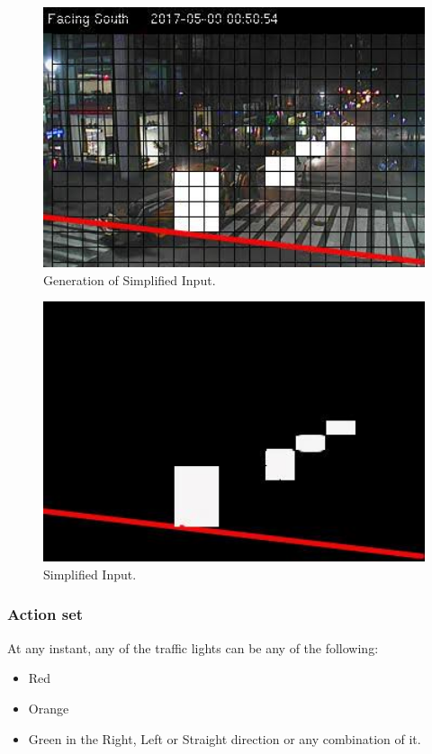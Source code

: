 \documentclass[a4paper,11pt]{article}
\begin{document}
				
				\begin{figure}[!h]
					\begin{centering}
						\includegraphics[width=15cm]{images/traffic3.png}
						\caption{Generation of Simplified Input.}
					\end{centering}
				\end{figure}

				
				\begin{figure}[!h]
					\begin{centering}
						\includegraphics[width=15cm]{images/traffic4.png}
						\caption{Simplified Input.}
					\end{centering}
				\end{figure}



			\subsubsection{Action set}
				At any instant, any of the traffic lights can be any of the following:
				\begin{itemize}
					\setlength\itemsep{0em}
					\item Red
					\item Orange
					\item Green in the Right, Left or Straight direction or any combination of it.
				\end{itemize}
\end{document}
